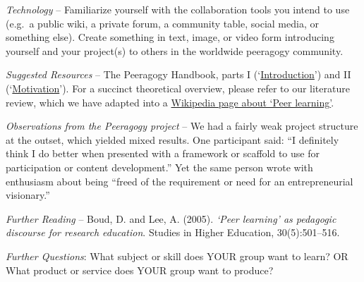 \emph{Technology} -- Familiarize yourself with the collaboration tools
you intend to use (e.g.~a public wiki, a private forum, a community
table, social media, or something else). Create something in text,
image, or video form introducing yourself and your project(s) to others
in the worldwide peeragogy community.

\emph{Suggested Resources} -- The Peeragogy Handbook, parts I
(`\href{http://peeragogy.org/}{Introduction}') and II
(`\href{http://peeragogy.org/motivation/}{Motivation}'). For a succinct
theoretical overview, please refer to our literature review, which we
have adapted into a
\href{http://en.wikipedia.org/wiki/Peer_learning}{Wikipedia page about
`Peer learning'}.

\emph{Observations from the Peeragogy project} -- We had a fairly weak
project structure at the outset, which yielded mixed results. One
participant said: ``I definitely think I do better when presented with a
framework or scaffold to use for participation or content development.''
Yet the same person wrote with enthusiasm about being ``freed of the
requirement or need for an entrepreneurial visionary.''

\emph{Further Reading} -- Boud, D. and Lee, A. (2005). \emph{`Peer
learning' as pedagogic discourse for research education}. Studies in
Higher Education, 30(5):501--516.

\emph{Further Questions}: {What subject or skill does YOUR group
want to learn?} OR {What product or service does YOUR group want
to produce?}





